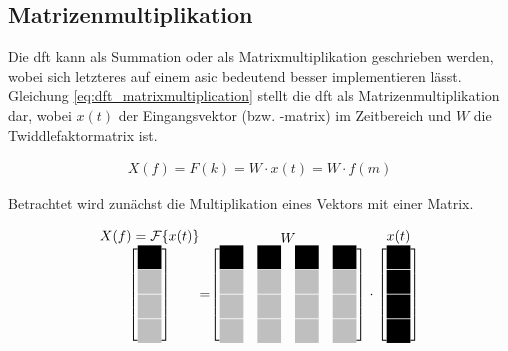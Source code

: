 \subsection{Matrizenmultiplikation}
Die \gls{dft} kann als Summation oder als Matrixmultiplikation geschrieben werden, wobei sich letzteres auf einem \gls{asic} bedeutend besser implementieren lässt. 
Gleichung \ref{eq:dft_matrixmultiplication} stellt die \gls{dft} als Matrizenmultiplikation dar, wobei $x(t)$ der Eingangsvektor (bzw. -matrix) im Zeitbereich und $W$ 
die Twiddlefaktormatrix ist.

\begin{align}\label{eq:dft_matrixmultiplication}
 X(f) = F(k) = W \cdot x(t) = W \cdot f(m)
\end{align}


Betrachtet wird zunächst die Multiplikation eines Vektors mit einer Matrix. 

\begingroup
\renewcommand*{\arraystretch}{1.0}

 \[
  \stackrel{\mbox{$X(f) = \mathcal{F}\{x(t)\}$}}{
  \begin{bmatrix}%
   \myBlackBox \\
   \myLightgrayBox \\
   \myLightgrayBox \\
   \myLightgrayBox
  \end{bmatrix}
  }
  =
  \stackrel{\mbox{$W$}}{
   \begin{bmatrix}
    \myBlackBox 	& \myBlackBox 		& \myBlackBox 		& \myBlackBox \\
    \myLightgrayBox 	& \myLightgrayBox 	& \myLightgrayBox 	& \myLightgrayBox \\
    \myLightgrayBox 	& \myLightgrayBox 	& \myLightgrayBox 	& \myLightgrayBox \\
    \myLightgrayBox 	& \myLightgrayBox 	& \myLightgrayBox 	& \myLightgrayBox
   \end{bmatrix}
  }
  \cdot
  \stackrel{\mbox{$x(t)$}}{
   \begin{bmatrix}
    \myBlackBox \\
    \myBlackBox \\
    \myBlackBox \\
    \myBlackBox
   \end{bmatrix}
  }
 \]
\endgroup

 \vspace{1cm}  
  
